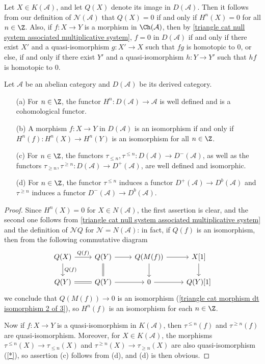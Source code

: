 \begin{remark}
Let $X\in K(\mathcal{A})$, and let $Q(X)$ denote its image in $D(\mathcal{A})$. Then it follows from our definition of $\mathcal{N}(\mathcal{A})$ that $Q(X)=0$ if and only if $H^n(X)=0$ for all $n\in\Z$. Also, if $f:X\to Y$ is a morphism in $\Ch(\mathcal{A})$, then by \cref{triangle cat null system associated multiplicative system}, $f=0$ in $D(\mathcal{A})$ if and only if there exist $X'$ and a quasi-isomorphism $g:X'\to X$ such that $fg$ is homotopic to $0$, or else, if and only if there exist $Y'$ and a quasi-isomorphism $h:Y\to Y'$ such that $hf$ is homotopic to $0$.
\end{remark}

\begin{proposition}\label{derived category of abelian cat prop}
Let $\mathcal{A}$ be an abelian category and $D(\mathcal{A})$ be its derived category.
\begin{enumerate}
    \item[(a)] For $n\in\Z$, the functor $H^n:D(\mathcal{A})\to\mathcal{A}$ is well defined and is a cohomological functor.
    \item[(b)] A morphism $f:X\to Y$ in $D(\mathcal{A})$ is an isomorphism if and only if $H^n(f):H^n(X)\to H^n(Y)$ is an isomorphism for all $n\in\Z$.
    \item[(c)] For $n\in\Z$, the functors $\tau_{\leq n},\tau^{\leq n}:D(\mathcal{A})\to D^-(\mathcal{A})$, as well as the functors $\tau_{\geq n},\tau^{\geq n}:D(\mathcal{A})\to D^+(\mathcal{A})$, are well defined and isomorphic.
    \item[(d)] For $n\in\Z$, the functor $\tau^{\leq n}$ induces a functor $D^+(\mathcal{A})\to D^b(\mathcal{A})$ and $\tau^{\geq n}$ induces a functor $D^-(\mathcal{A})\to D^b(\mathcal{A})$.
\end{enumerate}
\end{proposition}
\begin{proof}
Since $H^n(X)=0$ for $X\in N(\mathcal{A})$, the first assertion is clear, and the second one follows from \cref{triangle cat null system associated multiplicative system} and the definition of $\mathcal{N}Q$ for $\mathcal{N}=N(\mathcal{A})$: in fact, if $Q(f)$ is an isomorphism, then from the following commutative diagram
\[\begin{tikzcd}
Q(X)\ar[r,"Q(f)"]\ar[d,"Q(f)"]&Q(Y)\ar[r]\ar[d,equal]&Q(M(f))\ar[d]\ar[r]&X[1]\ar[d]\\
Q(Y)\ar[r,equal]&Q(Y)\ar[r]&0\ar[r]&Q(Y)[1]
\end{tikzcd}\]
we conclude that $Q(M(f))\to 0$ is an isomorphism (\cref{triangle cat morphism dt isomorphism 2 of 3}), so $H^n(f)$ is an isomorphism for each $n\in\Z$.\par
Now if $f:X\to Y$ is a quasi-isomorphism in $K(\mathcal{A})$, then $\tau^{\leq n}(f)$ and $\tau^{\geq n}(f)$ are quasi-isomorphism. Moreover, for $X\in K(\mathcal{A})$, the morphisms $\tau^{\leq n}(X)\to\tau_{\leq n}(X)$ and $\tau^{\geq n}(X)\to\tau_{\geq n}(X)$ are also quasi-isomorphism (\cref{*}), so assertion (c) follows from (d), and (d) is then obvious.
\end{proof}

